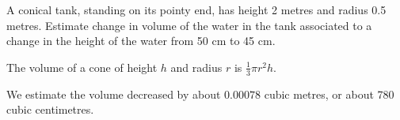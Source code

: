 \begin{question}
A conical tank, standing on its pointy end, has height 2 metres and radius 0.5 metres.
Estimate change in volume of the water in the tank associated to a change in the height of the water from 50 cm to 45 cm.
\begin{center}\end{center}
\end{question}
\begin{hint}
The volume of a cone of height $h$ and radius $r$ is
        $\frac{1}{3}\pi r^2 h$.
\end{hint}
\begin{answer}
We estimate the volume decreased by about $0.00078$ cubic metres, or about
780 cubic centimetres.
\end{answer}
